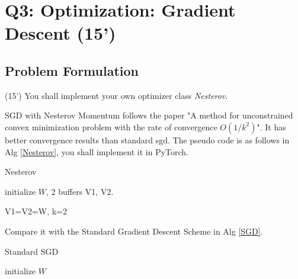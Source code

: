 \documentclass[12pt,a4paper]{article}
\theoremstyle{definition}
\begin{document}
\section{Q3: Optimization: Gradient Descent (15')}
\subsection{Problem Formulation}
(15') You shall implement your own optimizer class \textit{Nesterov}.

SGD with Nesterov Momentum follows the paper "A method for unconstrained convex minimization problem with the rate of convergence $O(1/k^{2})$". It has better convergence results than standard sgd. The pseudo code is as follows in Alg \ref{Nesterov}, you shall implement it in PyTorch.

\begin{center}
    \begin{minipage}[T]{0.78\textwidth}
\begin{algorithm}[H]
    \caption{Nesterov}
    \label{Nesterov}
    initialize $W$, 2 buffers V1, V2.

    V1=V2=W, k=2
    
    
    
\end{algorithm}
\end{minipage}
\end{center}

Compare it with the Standard Gradient Descent Scheme in Alg \ref{SGD}.

\begin{center}
    \begin{minipage}[T]{0.78\textwidth}
\begin{algorithm}[H]
    \caption{Standard SGD}
    \label{SGD}
    initialize $W$
    
    
    
\end{algorithm}
\end{minipage}
\end{center}
\end{document}
